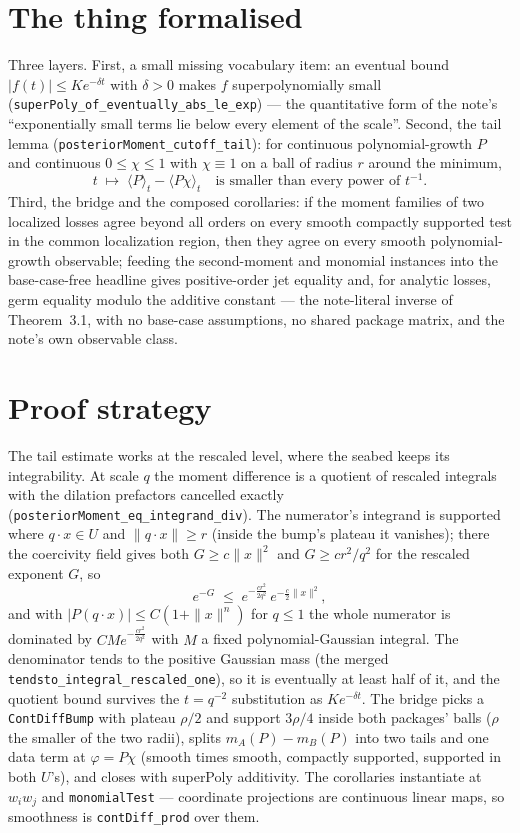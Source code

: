 \documentclass[11pt]{article}
\begin{document}
\section{The thing formalised}

Three layers. First, a small missing vocabulary item: an eventual bound
$|f(t)| \leq K e^{-\delta t}$ with $\delta > 0$ makes $f$ superpolynomially
small (\texttt{superPoly\_of\_eventually\_abs\_le\_exp}) --- the
quantitative form of the note's ``exponentially small terms lie below every
element of the scale''. Second, the tail lemma
(\texttt{posteriorMoment\_cutoff\_tail}): for continuous polynomial-growth
$P$ and continuous $0 \leq \chi \leq 1$ with $\chi \equiv 1$ on a ball of
radius $r$ around the minimum,
\[
t \;\longmapsto\; \langle P \rangle_t - \langle P\chi \rangle_t
\quad\text{is smaller than every power of } t^{-1}.
\]
Third, the bridge and the composed corollaries: if the moment families of
two localized losses agree beyond all orders on every smooth compactly
supported test in the common localization region, then they agree on every
smooth polynomial-growth observable; feeding the second-moment and monomial
instances into the base-case-free headline gives positive-order jet equality
and, for analytic losses, germ equality modulo the additive constant --- the
note-literal inverse of Theorem~3.1, with no base-case assumptions, no
shared package matrix, and the note's own observable class.

\section{Proof strategy}

The tail estimate works at the rescaled level, where the seabed keeps its
integrability. At scale $q$ the moment difference is a quotient of rescaled
integrals with the dilation prefactors cancelled exactly
(\texttt{posteriorMoment\_eq\_integrand\_div}). The numerator's integrand is
supported where $q \cdot x \in U$ and $\|q \cdot x\| \geq r$ (inside the
bump's plateau it vanishes); there the coercivity field gives both
$G \geq c\|x\|^2$ and $G \geq c r^2/q^2$ for the rescaled exponent $G$, so
\[
e^{-G} \;\leq\; e^{-\frac{c r^2}{2q^2}}\, e^{-\frac{c}{2}\|x\|^2},
\]
and with $|P(q \cdot x)| \leq C(1 + \|x\|^n)$ for $q \leq 1$ the whole
numerator is dominated by $C M e^{-\frac{c r^2}{2q^2}}$ with $M$ a fixed
polynomial-Gaussian integral. The denominator tends to the positive Gaussian
mass (the merged \texttt{tendsto\_integral\_rescaled\_one}), so it is
eventually at least half of it, and the quotient bound survives the
$t = q^{-2}$ substitution as $K e^{-\delta t}$. The bridge picks a
\texttt{ContDiffBump} with plateau $\rho/2$ and support $3\rho/4$ inside
both packages' balls ($\rho$ the smaller of the two radii), splits
$m_A(P) - m_B(P)$ into two tails and one data term at $\varphi = P\chi$
(smooth times smooth, compactly supported, supported in both $U$'s), and
closes with superPoly additivity. The corollaries instantiate at
$w_iw_j$ and \texttt{monomialTest} --- coordinate projections are continuous
linear maps, so smoothness is \texttt{contDiff\_prod} over them.
\end{document}
